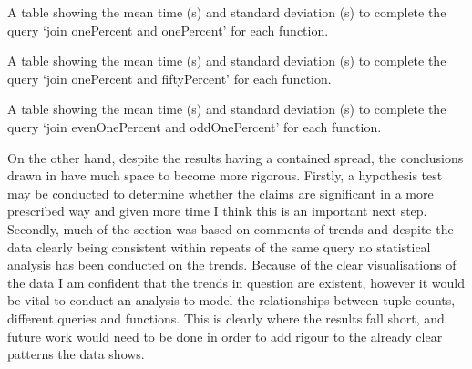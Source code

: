 \begin{table}[h]
\centering

\caption{A table showing the mean time (s) and standard deviation (s) to complete the query `join onePercent and onePercent' for each function.}
\label{tab:evaluation:std-dev-comparison-onePercent-onePercent}
\end{table}

\begin{table}[h]
\centering

\caption{A table showing the mean time (s) and standard deviation (s) to
complete the query `join onePercent and fiftyPercent' for each function.}
\label{tab:evaluation:std-dev-comparison-onePercent-fiftyPercent}
\end{table}

\begin{table}[h]
\centering

\caption{A table showing the mean time (s) and standard deviation (s) to
complete the query `join evenOnePercent and oddOnePercent' for each function.}
\label{tab:evaluation:std-dev-comparison-evenOnePercent-oddOnePercent}
\end{table}

On the other hand, despite the results having a contained spread, the
conclusions drawn in  have much space to become more
rigorous. Firstly, a hypothesis test may be conducted to determine whether the
claims are significant in a more prescribed way and given more time I think this
is an important next step. Secondly, much of the section was based on comments
of trends and despite the data clearly being consistent within repeats of the
same query no statistical analysis has been conducted on the trends. Because of
the clear visualisations of the data I am confident that the trends in question
are existent, however it would be vital to conduct an analysis to model the
relationships between tuple counts, different queries and functions. This is
clearly where the results fall short, and future work would need to be done in
order to add rigour to the already clear patterns the data shows.

